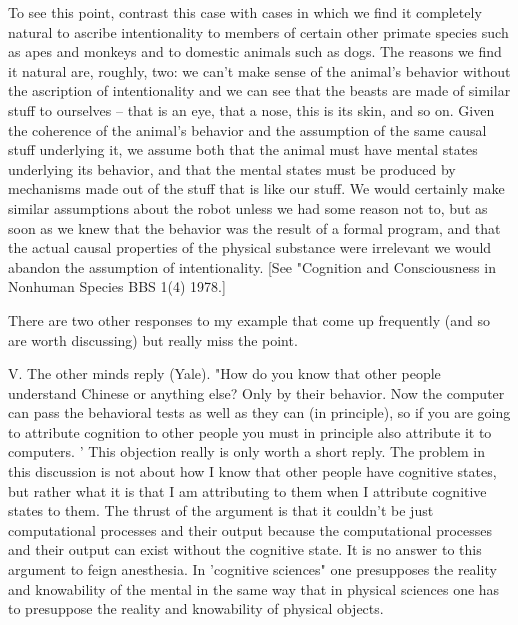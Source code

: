 To see this point, contrast this case with cases in which we find it completely natural to ascribe intentionality to
members of certain other primate species such as apes and monkeys and to domestic animals such as dogs. The
reasons we find it natural are, roughly, two: we can't make sense of the animal's behavior without the ascription
of intentionality and we can see that the beasts are made of similar stuff to ourselves -- that is an eye, that a
nose, this is its skin, and so on. Given the coherence of the animal's behavior and the assumption of the same
causal stuff underlying it, we assume both that the animal must have mental states underlying its behavior, and
that the mental states must be produced by mechanisms made out of the stuff that is like our stuff. We would
certainly make similar assumptions about the robot unless we had some reason not to, but as soon as we knew
that the behavior was the result of a formal program, and that the actual causal properties of the physical
substance were irrelevant we would abandon the assumption of intentionality. [See "Cognition and
Consciousness in Nonhuman Species BBS 1(4) 1978.]

There are two other responses to my example that come up frequently (and so are worth discussing) but really
miss the point.

V. The other minds reply (Yale). "How do you know that other people understand Chinese or anything else?
Only by their behavior. Now the computer can pass the behavioral tests as well as they can (in principle), so if
you are going to attribute cognition to other people you must in principle also attribute it to computers. '
This objection really is only worth a short reply. The problem in this discussion is not about how I know that
other people have cognitive states, but rather what it is that I am attributing to them when I attribute cognitive
states to them. The thrust of the argument is that it couldn't be just computational processes and their output
because the computational processes and their output can exist without the cognitive state. It is no answer to
this argument to feign anesthesia. In 'cognitive sciences" one presupposes the reality and knowability of the
mental in the same way that in physical sciences one has to presuppose the reality and knowability of physical
objects.

